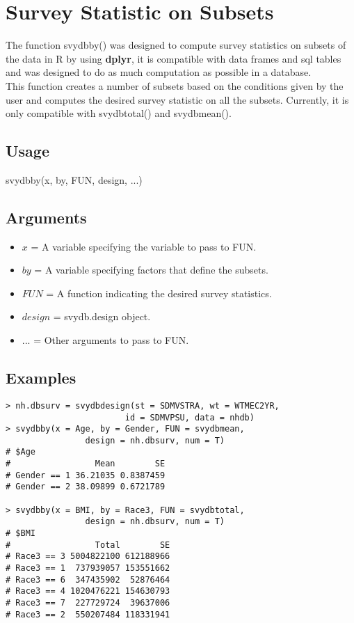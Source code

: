 \newpage
\section{Survey Statistic on Subsets}
The function {\ttfamily svydbby()} was designed to compute survey statistics on subsets of the data in {\sf R} by using {\bf dplyr}, it is compatible with data frames and sql tables and was designed to do as much computation as possible in a database.\\

This function creates a number of subsets based on the conditions given by the user and computes the desired survey statistic on all the subsets. Currently, it is only compatible with {\ttfamily svydbtotal()} and {\ttfamily svydbmean()}.\\

\subsection{Usage}
\begin{center}
    {\ttfamily svydbby(x, by, FUN, design, ...)}
\end{center}

\subsection{Arguments}
\begin{itemize}
\item $x$ = A variable specifying the variable to pass to FUN.

\item $by$ = A variable specifying factors that define the subsets.

\item $FUN$ = A function indicating the desired survey statistics.

\item $design$ = svydb.design object.

\item $...$ = Other arguments to pass to FUN.
\end{itemize}

\subsection{Examples}
\begin{lstlisting}
> nh.dbsurv = svydbdesign(st = SDMVSTRA, wt = WTMEC2YR, 
                        id = SDMVPSU, data = nhdb)
> svydbby(x = Age, by = Gender, FUN = svydbmean, 
                design = nh.dbsurv, num = T)
# $Age
#                 Mean        SE
# Gender == 1 36.21035 0.8387459
# Gender == 2 38.09899 0.6721789

> svydbby(x = BMI, by = Race3, FUN = svydbtotal, 
                design = nh.dbsurv, num = T)
# $BMI
#                 Total        SE
# Race3 == 3 5004822100 612188966
# Race3 == 1  737939057 153551662
# Race3 == 6  347435902  52876464
# Race3 == 4 1020476221 154630793
# Race3 == 7  227729724  39637006
# Race3 == 2  550207484 118331941
\end{lstlisting}
\\

